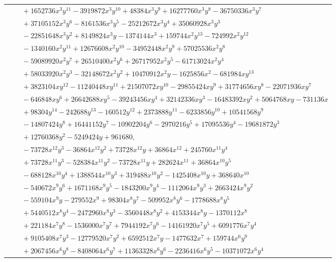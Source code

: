 \documentclass[11pt]{article}
\begin{document}
\begin{longtable}{@{}ll@{}}
 & $\quad +1652736x^{3}y^{11}-3919872x^{3}y^{10}+48384x^{3}y^{9}+16277760x^{3}y^{8}-36750336x^{3}y^{7}$\\
 & $\quad +37105152x^{3}y^{6}-8161536x^{3}y^{5}-25212672x^{3}y^{4}+35060928x^{3}y^{3}$\\
 & $\quad -22851648x^{3}y^{2}+8149824x^{3}y-1374144x^{3}+159744x^{2}y^{13}-724992x^{2}y^{12}$\\
 & $\quad -1340160x^{2}y^{11}+12676608x^{2}y^{10}-34952448x^{2}y^{9}+57025536x^{2}y^{8}$\\
 & $\quad -59089920x^{2}y^{7}+26510400x^{2}y^{6}+26717952x^{2}y^{5}-61713024x^{2}y^{4}$\\
 & $\quad +58033920x^{2}y^{3}-32148672x^{2}y^{2}+10470912x^{2}y-1625856x^{2}-681984xy^{13}$\\
 & $\quad +3823104xy^{12}-11240448xy^{11}+21507072xy^{10}-29855424xy^{9}+31774656xy^{8}-22071936xy^{7}$\\
 & $\quad -646848xy^{6}+26642688xy^{5}-39243456xy^{4}+32142336xy^{3}-16483392xy^{2}+5064768xy-731136x$\\
 & $\quad +98304y^{14}-242688y^{13}-160512y^{12}+2373888y^{11}-6233856y^{10}+10541568y^{9}$\\
 & $\quad -14807424y^{8}+16441152y^{7}-10902204y^{6}-2970216y^{5}+17095536y^{4}-19681872y^{3}$\\
 & $\quad +12760368y^{2}-5249424y+961680,$\\
 & $\quad -73728x^{12}y^{3}-36864x^{12}y^{2}+73728x^{12}y+36864x^{12}+245760x^{11}y^{4}$\\
 & $\quad +73728x^{11}y^{3}-528384x^{11}y^{2}-73728x^{11}y+282624x^{11}+36864x^{10}y^{5}$\\
 & $\quad -688128x^{10}y^{4}+1388544x^{10}y^{3}+319488x^{10}y^{2}-1425408x^{10}y+368640x^{10}$\\
 & $\quad -540672x^{9}y^{6}+1671168x^{9}y^{5}-1843200x^{9}y^{4}-1112064x^{9}y^{3}+2663424x^{9}y^{2}$\\
 & $\quad -559104x^{9}y-279552x^{9}+98304x^{8}y^{7}-509952x^{8}y^{6}-1778688x^{8}y^{5}$\\
 & $\quad +5440512x^{8}y^{4}-2472960x^{8}y^{3}-3560448x^{8}y^{2}+4153344x^{8}y-1370112x^{8}$\\
 & $\quad +221184x^{7}y^{8}-1536000x^{7}y^{7}+7944192x^{7}y^{6}-14161920x^{7}y^{5}+6091776x^{7}y^{4}$\\
 & $\quad +9105408x^{7}y^{3}-12779520x^{7}y^{2}+6592512x^{7}y-1477632x^{7}+159744x^{6}y^{9}$\\
 & $\quad +2067456x^{6}y^{8}-8408064x^{6}y^{7}+11363328x^{6}y^{6}-2236416x^{6}y^{5}-10371072x^{6}y^{4}$\\

\end{longtable}
\end{document}
